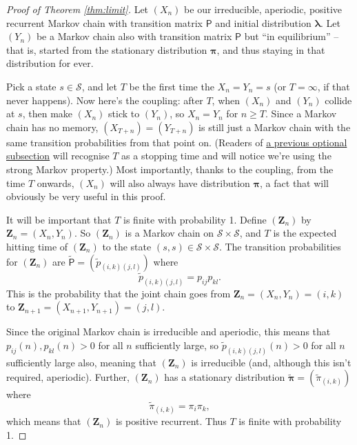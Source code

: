 \documentclass[
  a4paper,
]{article}
\theoremstyle{definition}
\theoremstyle{definition}
\theoremstyle{definition}
\theoremstyle{remark}
\begin{document}
\begin{proof}[Proof of Theorem \ref{thm:limit}]

Let \((X_n)\) be our irreducible, aperiodic, positive recurrent Markov chain with transition matrix \(\mathsf P\) and initial distribution \(\boldsymbol\lambda\). Let \((Y_n)\) be a Markov chain also with transition matrix \(\mathsf P\) but ``in equilibrium'' -- that is, started from the stationary distribution \(\boldsymbol\pi\), and thus staying in that distribution for ever.

Pick a state \(s \in \mathcal S\), and let \(T\) be the first time the \(X_n = Y_n = s\) (or \(T = \infty\), if that never happens). Now here's the coupling: after \(T\), when \((X_n)\) and \((Y_n)\) collide at \(s\), then make \((X_n)\) stick to \((Y_n)\), so \(X_n = Y_n\) for \(n \geq T\). Since a Markov chain has no memory, \((X_{T+n}) = (Y_{T+n})\) is still just a Markov chain with the same transition probabilities from that point on. (Readers of \protect\hyperlink{S09-strong-markov}{a previous optional subsection} will recognise \(T\) as a stopping time and will notice we're using the strong Markov property.) Most importantly, thanks to the coupling, from the time \(T\) onwards, \((X_n)\) will also always have distribution \(\boldsymbol\pi\), a fact that will obviously be very useful in this proof.

It will be important that \(T\) is finite with probability 1. Define \((\mathbf Z_n)\) by \(\mathbf Z_n = (X_n, Y_n)\). So \((\mathbf Z_n)\) is a Markov chain on \(\mathcal S \times \mathcal S\), and \(T\) is the expected hitting time of \((\mathbf Z_n)\) to the state \((s, s) \in \mathcal S \times \mathcal S\). The transition probabilities for \((\mathbf Z_n)\) are \(\mathsf{\tilde P} = (\tilde p_{(i,k)(j,l)})\) where
\[ \tilde p_{(i,k)(j,l)} = p_{ij}p_{kl} . \]
This is the probability that the joint chain goes from \(\mathbf Z_n = (X_n, Y_n) = (i, k)\) to \(\mathbf Z_{n+1} = (X_{n+1}, Y_{n+1}) = (j, l)\).

Since the original Markov chain is irreducible and aperiodic, this means that \(p_{ij}(n), p_{kl}(n) > 0\) for all \(n\) sufficiently large, so \(\tilde p_{(i,k)(j,l)}(n) > 0\) for all \(n\) sufficiently large also, meaning that \((\mathbf Z_n)\) is irreducible (and, although this isn't required, aperiodic). Further, \((\mathbf Z_n)\) has a stationary distribution \(\mathbf{\tilde \pi} = (\tilde \pi_{(i,k)})\) where
\[ \tilde \pi_{(i,k)} = \pi_i \pi_k , \]
which means that \((\mathbf Z_n)\) is positive recurrent. Thus \(T\) is finite with probability 1.


\end{proof}
\end{document}
